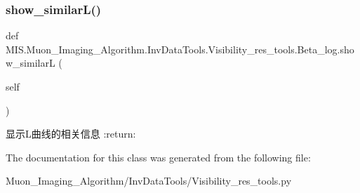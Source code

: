 \subsubsection{\texorpdfstring{show\+\_\+similar\+L()}{show\_similarL()}}
{\footnotesize\ttfamily def M\+I\+S.\+Muon\+\_\+\+Imaging\+\_\+\+Algorithm.\+Inv\+Data\+Tools.\+Visibility\+\_\+res\+\_\+tools.\+Beta\+\_\+log.\+show\+\_\+similarL (\begin{DoxyParamCaption}\item[{}]{self }\end{DoxyParamCaption})}

\begin{DoxyVerb}显示L曲线的相关信息
:return:
\end{DoxyVerb}
 

The documentation for this class was generated from the following file\+:\begin{DoxyCompactItemize}
\item 
Muon\+\_\+\+Imaging\+\_\+\+Algorithm/\+Inv\+Data\+Tools/Visibility\+\_\+res\+\_\+tools.\+py\end{DoxyCompactItemize}
